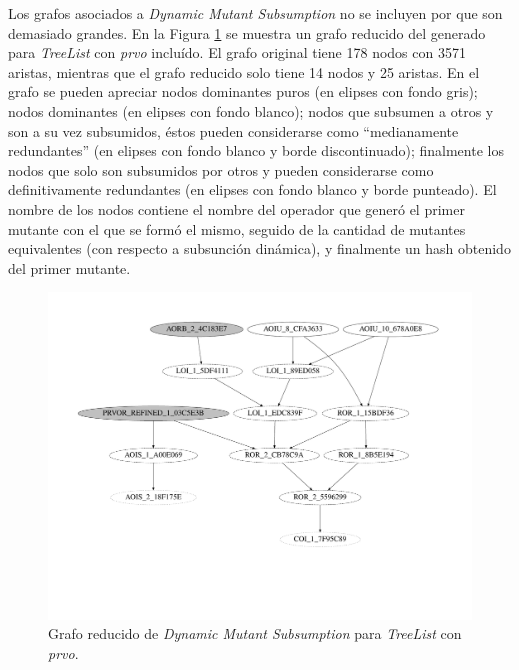 Los grafos asociados a \emph{Dynamic Mutant Subsumption} no se incluyen por que son demasiado grandes. En la Figura \ref{figures.examples.subsumption.reducedTreeListGraph} se muestra un grafo reducido del generado para \emph{TreeList} con \emph{prvo} inclu\'ido. El grafo original tiene 178 nodos con 3571 aristas, mientras que el grafo reducido solo tiene 14 nodos y 25 aristas. En el grafo se pueden apreciar nodos dominantes puros (en elipses con fondo gris); nodos dominantes (en elipses con fondo blanco); nodos que subsumen a otros y son a su vez subsumidos, \'estos pueden considerarse como ``medianamente redundantes'' (en elipses con fondo blanco y borde discontinuado); finalmente los nodos que solo son subsumidos por otros y pueden considerarse como definitivamente redundantes (en elipses con fondo blanco y borde punteado). El nombre de los nodos contiene el nombre del operador que gener\'o el primer mutante con el que se form\'o el mismo, seguido de la cantidad de mutantes equivalentes (con respecto a subsunci\'on din\'amica), y finalmente un hash obtenido del primer mutante.

\begin{figure}
	\includegraphics[width=\linewidth]{figures/subsumption/dsg_apache_prvo_segment.pdf}
	\caption{Grafo reducido de \emph{Dynamic Mutant Subsumption} para \emph{TreeList} con \emph{prvo}.}
	\label{figures.examples.subsumption.reducedTreeListGraph}
\end{figure}

